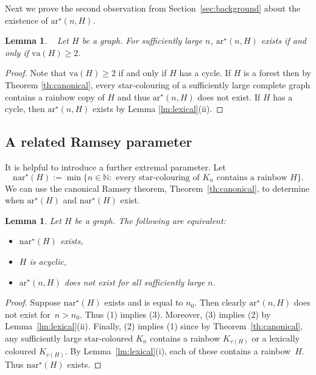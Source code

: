 \documentclass[a4paper, 12pt]{article}
\numberwithin{equation}{section}
\newtheorem{lemma}[theorem]{Lemma}
\def\sar{{\mathrm{ar}^{\star}}}
\def\va{{\mathrm{va}}}
\def\nsar{{\mathrm{n}\sar}}
\begin{document}
Next we prove the second observation from Section~\ref{sec:background} about the existence of $\sar(n,H)$.

\begin{lemma}\label{lm:obs2}~
Let  $H$ be a graph. 
For sufficiently large $n$, $\sar(n,H)$ exists if and only if $\va(H) \geq 2$.
\end{lemma}

\begin{proof}
Note that $\va(H)\ge 2$ if and only if $H$ has a cycle.  If $H$ is a forest then by Theorem \ref{th:canonical}, every star-colouring of a sufficiently large complete graph contains a rainbow copy of $H$ and thus $\sar(n,H)$ does not  exist. If $H$ has a cycle, then $\sar(n,H)$ exists by Lemma \ref{lm:lexical}(ii).
\end{proof}

\subsection{A related Ramsey parameter}\label{sec:nsar}


It is helpful to introduce a further extremal parameter. Let
$$
\nsar(H) := \min\{n \in \mathbb{N}: \text{ every star-colouring of }K_n\text{ contains a rainbow }H\}. 
$$
We can use the canonical Ramsey theorem, Theorem~\ref{th:canonical}, to determine when $\sar(H)$ and $\nsar(H)$ exist.

\begin{lemma}\label{lm:exists}
Let $H$ be a graph. The following are equivalent:
\begin{itemize}
\item[{\rm (1)}] $\nsar(H)$ exists,
\item[{\rm (2)}] $H$ is acyclic,
\item[{\rm (3)}] $\sar(n,H)$ does not exist for all sufficiently large $n$.
\end{itemize}
\end{lemma}

\begin{proof}
    Suppose $\nsar(H)$ exists and is equal to $n_0$. Then clearly $\sar(n,H)$ does not exist for~$n>n_0$. Thus (1) implies (3). 
   Moreover, (3) implies (2) by Lemma~\ref{lm:lexical}(ii).
   Finally, (2) implies (1) since by Theorem~\ref{th:canonical}, any  sufficiently large star-coloured $K_n$ contains a rainbow $K_{v(H)}$   or a lexically coloured  $K_{v(H)}$. By Lemma~\ref{lm:lexical}(i), each of these contains a rainbow~$H$.
Thus $\nsar(H)$ exists.
\end{proof}
\end{document}
